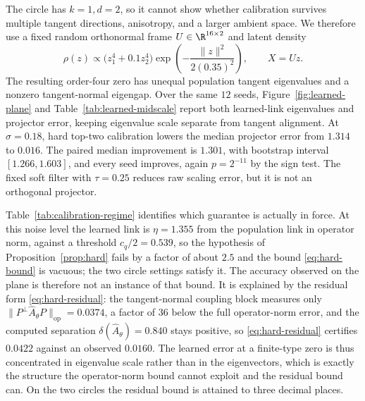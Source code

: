\documentclass[10pt]{article}
\theoremstyle{c2fup}
\newcommand{\op}{\mathrm{op}}
\begin{document}
The circle has $k=1,d=2$, so it cannot show whether calibration survives multiple tangent directions, anisotropy, and a larger ambient space.  We therefore use a fixed random orthonormal frame $U\in\R^{16\times2}$ and latent density
\begin{equation}
  \rho(z)\propto\bigl(z_1^4+0.1z_2^4\bigr)
  \exp\!\left(-\frac{\|z\|^2}{2(0.35)^2}\right),
  \qquad X=Uz.
  \label{eq:learned-plane-density}
\end{equation}
The resulting order-four zero has unequal population tangent eigenvalues and a nonzero tangent-normal eigengap.  Over the same $12$ seeds, Figure~\ref{fig:learned-plane} and Table~\ref{tab:learned-midscale} report both learned-link eigenvalues and projector error, keeping eigenvalue scale separate from tangent alignment.  At $\sigma=0.18$, hard top-two calibration lowers the median projector error from $1.314$ to $0.016$.  The paired median improvement is $1.301$, with bootstrap interval $[1.266,1.603]$, and every seed improves, again $p=2^{-11}$ by the sign test.  The fixed soft filter with $\tau=0.25$ reduces raw scaling error, but it is not an orthogonal projector.

Table~\ref{tab:calibration-regime} identifies which guarantee is actually in force.  At this noise level the learned link is $\eta=1.355$ from the population link in operator norm, against a threshold $c_q/2=0.539$, so the hypothesis of Proposition~\ref{prop:hard} fails by a factor of about $2.5$ and the bound \eqref{eq:hard-bound} is vacuous; the two circle settings satisfy it.  The accuracy observed on the plane is therefore not an instance of that bound.  It is explained by the residual form \eqref{eq:hard-residual}: the tangent-normal coupling block measures only $\|P^\perp\widehat A_\theta P\|_\op=0.0374$, a factor of $36$ below the full operator-norm error, and the computed separation $\delta(\widehat A_\theta)=0.840$ stays positive, so \eqref{eq:hard-residual} certifies $0.0422$ against an observed $0.0160$.  The learned error at a finite-type zero is thus concentrated in eigenvalue scale rather than in the eigenvectors, which is exactly the structure the operator-norm bound cannot exploit and the residual bound can.  On the two circles the residual bound is attained to three decimal places.
\end{document}
